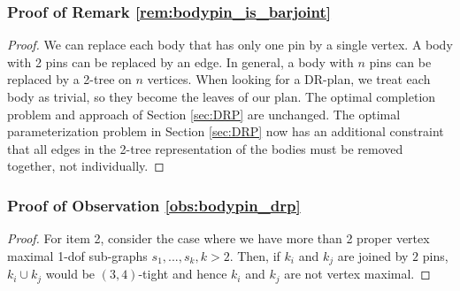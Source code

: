 \subsubsection{Proof of Remark \ref{rem:bodypin_is_barjoint}}
\begin{proof}
    We can replace each body that has only one pin by a single vertex. A body with 2 pins can be replaced by an edge. In general, a body with $n$ pins can be replaced by a 2-tree on $n$ vertices. When looking for a DR-plan, we treat each body as trivial, so they become the leaves of our plan. The optimal completion problem and approach of Section \ref{sec:DRP} are unchanged. The optimal parameterization problem in Section \ref{sec:DRP} now has an additional constraint that all edges in the 2-tree representation of the bodies must be removed together, not individually.
\end{proof}

\subsubsection{Proof of Observation \ref{obs:bodypin_drp}}
\begin{proof}

    For item 2, consider the case where we have more than 2 proper vertex maximal 1-dof sub-graphs $s_1, ..., s_k, k > 2$. Then, if $k_i$ and $k_j$ are joined by $2$ pins, $k_i \cup k_j$ would be $(3,4)$-tight and hence $k_i$ and $k_j$ are not vertex maximal.
\end{proof}

